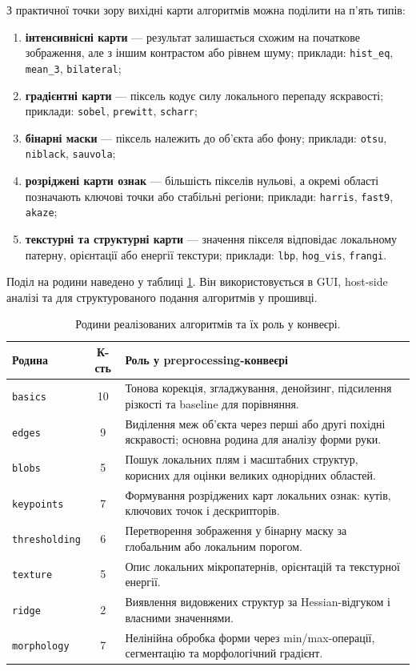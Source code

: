 \documentclass[a4paper,12pt]{article}
\begin{document}
З практичної точки зору вихідні карти алгоритмів можна поділити на п'ять типів:
\begin{enumerate}
	\item \textbf{інтенсивнісні карти} --- результат залишається схожим на початкове зображення, але з іншим контрастом або рівнем шуму; приклади: \texttt{hist\_eq}, \texttt{mean\_3}, \texttt{bilateral};
	\item \textbf{градієнтні карти} --- піксель кодує силу локального перепаду яскравості; приклади: \texttt{sobel}, \texttt{prewitt}, \texttt{scharr};
	\item \textbf{бінарні маски} --- піксель належить до об'єкта або фону; приклади: \texttt{otsu}, \texttt{niblack}, \texttt{sauvola};
	\item \textbf{розріджені карти ознак} --- більшість пікселів нульові, а окремі області позначають ключові точки або стабільні регіони; приклади: \texttt{harris}, \texttt{fast9}, \texttt{akaze};
	\item \textbf{текстурні та структурні карти} --- значення пікселя відповідає локальному патерну, орієнтації або енергії текстури; приклади: \texttt{lbp}, \texttt{hog\_vis}, \texttt{frangi}.
\end{enumerate}

Поділ на родини наведено у таблиці \ref{tab:family_catalog}. Він використовується в GUI, host-side аналізі та для структурованого подання алгоритмів у прошивці.

\begin{table}[H]
	\centering\small
	\renewcommand{\arraystretch}{1.12}
	\caption{Родини реалізованих алгоритмів та їх роль у конвеєрі.}
	\label{tab:family_catalog}
	\begin{tabular}{@{}l c p{}@{}}
		\toprule
		Родина & К-сть & Роль у preprocessing-конвеєрі \\
		\midrule
		\texttt{basics} & 10 & Тонова корекція, згладжування, денойзинг, підсилення різкості та baseline для порівняння. \\
		\texttt{edges} & 9 & Виділення меж об'єкта через перші або другі похідні яскравості; основна родина для аналізу форми руки. \\
		\texttt{blobs} & 5 & Пошук локальних плям і масштабних структур, корисних для оцінки великих однорідних областей. \\
		\texttt{keypoints} & 7 & Формування розріджених карт локальних ознак: кутів, ключових точок і дескрипторів. \\
		\texttt{thresholding} & 6 & Перетворення зображення у бінарну маску за глобальним або локальним порогом. \\
		\texttt{texture} & 5 & Опис локальних мікропатернів, орієнтацій та текстурної енергії. \\
		\texttt{ridge} & 2 & Виявлення видовжених структур за Hessian-відгуком і власними значеннями. \\
		\texttt{morphology} & 7 & Нелінійна обробка форми через min/max-операції, сегментацію та морфологічний градієнт. \\
		\bottomrule
	\end{tabular}
\end{table}
\end{document}
